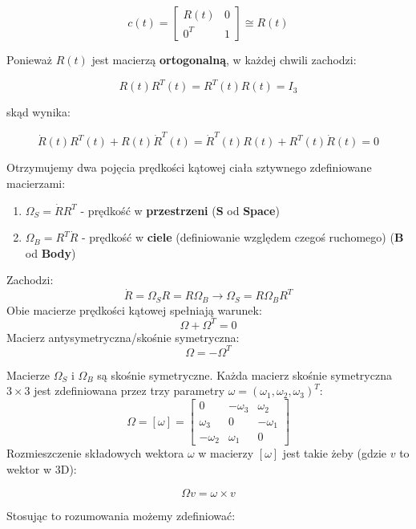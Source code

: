 \documentclass{article}
\begin{document}
\Large
$$
    c\left(t\right)=
    \begin{bmatrix}
        R(t)  & 0 \\[0.3em]
        0^{T} & 1
    \end{bmatrix}
    \cong
    R(t)
$$
\normalsize

Ponieważ $R(t)$ jest macierzą {\bf ortogonalną}, w każdej chwili zachodzi:

$$
    R(t)R^{T}(t)=R^{T}(t)R(t)=I_{3}
$$

skąd wynika:

$$
    \dot R(t)R^{T}(t)+R(t)\dot R^{T}(t)=\dot R^{T}(t)R(t)+R^{T}(t)\dot R(t)=0
$$

Otrzymujemy dwa pojęcia prędkości kątowej ciała sztywnego zdefiniowane macierzami:

\begin{enumerate}
    \item $\Omega_{S}=\dot R R^{T}$ - prędkość w {\bf przestrzeni} ({\bf S} od {\bf Space})
    \item $\Omega_{B}=R^{T} \dot R$ - prędkość w {\bf ciele} (definiowanie względem czegoś ruchomego) ({\bf B} od {\bf Body})
\end{enumerate}


Zachodzi:
\Large
$$
    \dot R =\Omega_{S}R=R\Omega_{B} \rightarrow \Omega_{S}=R\Omega_{B}R^{T}
$$
\normalsize
Obie macierze prędkości kątowej spełniają warunek:
\Large
$$
    \Omega+\Omega^{T}=0
$$
\normalsize
Macierz antysymetryczna/skośnie symetryczna:
\Large
$$
    \Omega = -\Omega^{T}
$$
\normalsize

Macierze $\Omega_{S}$ i $\Omega_{B}$ są skośnie symetryczne. Każda macierz skośnie symetryczna $3\times3$ jest zdefiniowana przez trzy parametry $\omega = \left(\omega_{1}, \omega_{2}, \omega_{3}\right)^{T}$:
\Large
$$
    \Omega=\left[\omega\right]=
    \begin{bmatrix}
        0           & -\omega_{3} & \omega_{2}  \\[0.3em]
        \omega_{3}  & 0           & -\omega_{1} \\[0.3em]
        -\omega_{2} & \omega_{1}  & 0
    \end{bmatrix}
$$
\normalsize
Rozmieszczenie składowych wektora $\omega$ w macierzy $\left[\omega\right]$ jest takie żeby (gdzie $v$ to wektor w 3D):

\Large
$$
    \Omega v = \omega \times v
$$
\normalsize

\newpage

Stosując to rozumowania możemy zdefiniować:
\end{document}
